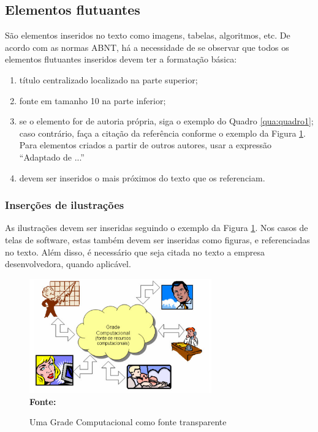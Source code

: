 \subsection{\esp Elementos flutuantes}

São elementos inseridos no texto como imagens, tabelas, algoritmos, etc.
De acordo com as normas ABNT, há a necessidade de se observar que todos os elementos flutuantes inseridos devem ter a formatação básica:

\begin{enumerate} [label={\alph*})]
 \item título centralizado localizado na parte superior; 
 \item fonte em tamanho 10 na parte inferior;
 \item se o elemento for de autoria própria, siga o exemplo do Quadro \ref{qua:quadro1}; caso contrário, faça a citação da referência conforme o exemplo da Figura \ref{fig:figura1}. Para elementos criados a partir de outros autores, usar a expressão  ``Adaptado de ...'' 
 \item devem ser inseridos o mais próximos do texto que os referenciam.
\end{enumerate}


\subsubsection{\esp Inserções de ilustrações}

As ilustrações devem ser inseridas seguindo o exemplo da Figura \ref{fig:figura1}. Nos casos de telas de software, estas também devem ser inseridas como figuras, e referenciadas no texto. Além disso, é necessário que seja citada no texto a empresa desenvolvedora, quando aplicável. 

\begin{figure}[ht]
	\centering	
	\caption{Uma Grade Computacional como fonte transparente}
	\vspace{-0.4cm}
	\includegraphics[width=0.7\textwidth]{figuras/grade-comp.png}
	 \vspace{-0.2cm}
	\\\textbf{\footnotesize Fonte:  }
	\label{fig:figura1}
\end{figure}
\vspace{-0.5cm}

